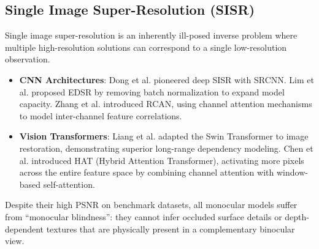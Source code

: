 \documentclass[10pt,journal,compsoc]{IEEEtran}
\begin{document}
\subsection{Single Image Super-Resolution (SISR)}
Single image super-resolution is an inherently ill-posed inverse problem where multiple high-resolution solutions can correspond to a single low-resolution observation. 
\begin{itemize}
    \item \textbf{CNN Architectures}: Dong et al. \cite{dong2015image} pioneered deep SISR with SRCNN. Lim et al. \cite{lim2017enhanced} proposed EDSR by removing batch normalization to expand model capacity. Zhang et al. \cite{zhang2018image} introduced RCAN, using channel attention mechanisms to model inter-channel feature correlations.
    \item \textbf{Vision Transformers}: Liang et al. \cite{liang2021swinir} adapted the Swin Transformer to image restoration, demonstrating superior long-range dependency modeling. Chen et al. \cite{chen2023activating} introduced HAT (Hybrid Attention Transformer), activating more pixels across the entire feature space by combining channel attention with window-based self-attention.
\end{itemize}
Despite their high PSNR on benchmark datasets, all monocular models suffer from ``monocular blindness'': they cannot infer occluded surface details or depth-dependent textures that are physically present in a complementary binocular view.
\end{document}
